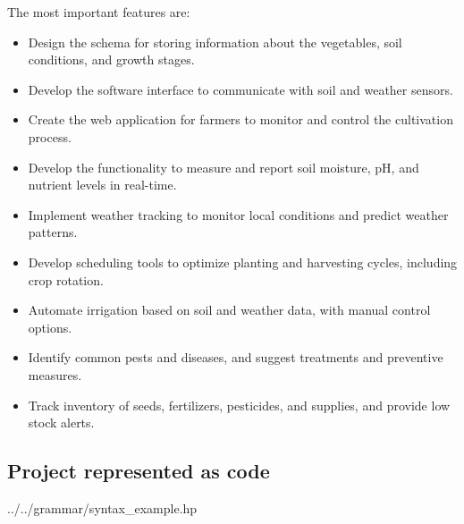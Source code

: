 The most important features are:
\begin{itemize}
	\item Design the schema for storing information about the vegetables, soil conditions, and growth stages.
	\item Develop the software interface to communicate with soil and weather sensors.
	\item Create the web application for farmers to monitor and control the cultivation process.
	\item Develop the functionality to measure and report soil moisture, pH, and nutrient levels in real-time.
	\item Implement weather tracking to monitor local conditions and predict weather patterns.
	\item Develop scheduling tools to optimize planting and harvesting cycles, including crop rotation.
	\item Automate irrigation based on soil and weather data, with manual control options.
	\item Identify common pests and diseases, and suggest treatments and preventive measures.
	\item Track inventory of seeds, fertilizers, pesticides, and supplies, and provide low stock alerts.
\end{itemize}

\subsection {Project represented as code}
 {../../grammar/syntax_example.hp}
